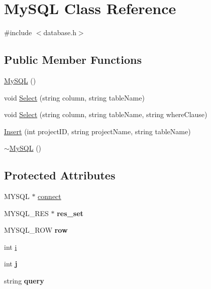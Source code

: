 \hypertarget{classMySQL}{\section{My\-S\-Q\-L Class Reference}
\label{classMySQL}
}


{\ttfamily \#include $<$database.\-h$>$}

\subsection*{Public Member Functions}
\begin{DoxyCompactItemize}
\item 
\hyperlink{classMySQL_abc2ca1b4be66f7e588e00dab96d91d43}{My\-S\-Q\-L} ()
\item 
void \hyperlink{classMySQL_a95aaf59d01eb141bf2104cde6f4872a8}{Select} (string column, string table\-Name)
\item 
void \hyperlink{classMySQL_a7d6ebbeebbf159103c3ade8eff8f3c86}{Select} (string column, string table\-Name, string where\-Clause)
\item 
\hyperlink{classMySQL_ace1ac1b227cc6f1370b6f50f79732386}{Insert} (int project\-I\-D, string project\-Name, string table\-Name)
\item 
\hyperlink{classMySQL_ab27885d0695900ade2b7a0d57375a9bf}{$\sim$\-My\-S\-Q\-L} ()
\end{DoxyCompactItemize}
\subsection*{Protected Attributes}
\begin{DoxyCompactItemize}
\item 
M\-Y\-S\-Q\-L $\ast$ \hyperlink{classMySQL_a56a2a9159f6d46d8b3bd648e1f08e2b1}{connect}
\item 
\hypertarget{classMySQL_abfe0a8f3fe7af0a582be5882f0afe69d}{M\-Y\-S\-Q\-L\-\_\-\-R\-E\-S $\ast$ {\bfseries res\-\_\-set}}\label{classMySQL_abfe0a8f3fe7af0a582be5882f0afe69d}

\item 
\hypertarget{classMySQL_a56c73e3942ca040f13164e957a41a340}{M\-Y\-S\-Q\-L\-\_\-\-R\-O\-W {\bfseries row}}\label{classMySQL_a56c73e3942ca040f13164e957a41a340}

\item 
int \hyperlink{classMySQL_ae461697dbdebb43334caa98e80bd5526}{i}
\item 
\hypertarget{classMySQL_a565d31fcec8437c21f08e7ca008cb2b6}{int {\bfseries j}}\label{classMySQL_a565d31fcec8437c21f08e7ca008cb2b6}

\item 
\hypertarget{classMySQL_ae709a2ac6d1bd455c31077fe760f3cb7}{string {\bfseries query}}\label{classMySQL_ae709a2ac6d1bd455c31077fe760f3cb7}

\end{DoxyCompactItemize}


